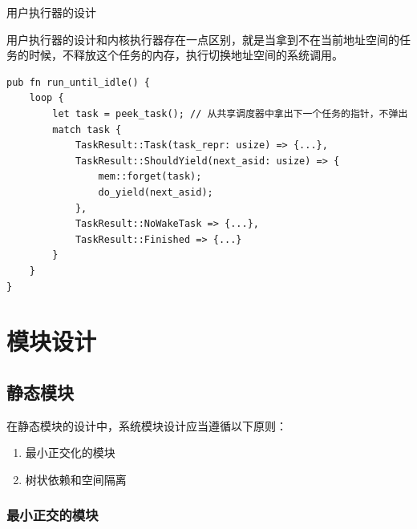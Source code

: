用户执行器的设计

用户执行器的设计和内核执行器存在一点区别，就是当拿到不在当前地址空间的任务的时候，不释放这个任务的内存，执行切换地址空间的系统调用。

\begin{lstlisting}[caption=用户执行器的设计]
pub fn run_until_idle() {
    loop {
        let task = peek_task(); // 从共享调度器中拿出下一个任务的指针，不弹出
        match task {
            TaskResult::Task(task_repr: usize) => {...},
            TaskResult::ShouldYield(next_asid: usize) => {
                mem::forget(task);
                do_yield(next_asid);
            },
            TaskResult::NoWakeTask => {...},
            TaskResult::Finished => {...}
        }
    }
}
\end{lstlisting}

\section{模块设计}

\subsection{静态模块}

在静态模块的设计中，系统模块设计应当遵循以下原则：

\begin{enumerate}
    \item 最小正交化的模块
    \item 树状依赖和空间隔离
\end{enumerate}

\subsubsection{最小正交的模块}


